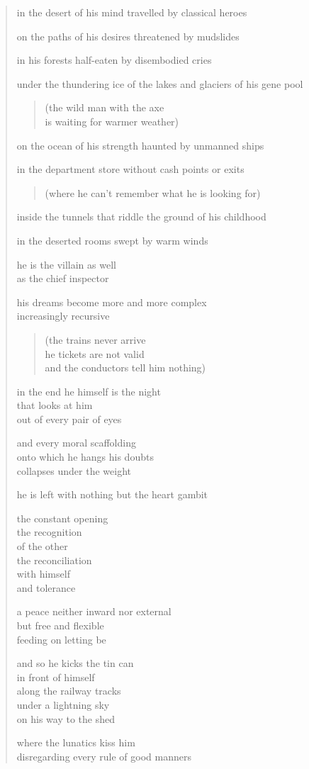 \begin{verse}

in the desert of his mind travelled by classical heroes

on the paths of his desires threatened by mudslides

in his forests half-eaten by disembodied cries

under the thundering ice of the lakes and glaciers of his gene pool

\begin{quote}
(the wild man with the axe\\
is waiting for warmer weather)
\end{quote}

on the ocean of his strength haunted by unmanned ships

in the department store without cash points or exits

\begin{quote}
(where he can't remember what he is looking for)
\end{quote}

inside the tunnels that riddle the ground of his childhood

in the deserted rooms swept by warm winds

he is the villain as well\\
as the chief inspector

his dreams become more and more complex\\
increasingly recursive

\begin{quote}
(the trains never arrive\\
he tickets are not valid\\
and the conductors tell him nothing)
\end{quote}

in the end he himself is the night\\
that looks at him\\
out of every pair of eyes

and every moral scaffolding\\
onto which he hangs his doubts\\
collapses under the weight

he is left with nothing but the heart gambit

the constant opening\\
the recognition\\
of the other\\
the reconciliation\\
with himself\\
and tolerance

a peace neither inward nor external\\
but free and flexible\\
feeding on letting be

and so he kicks the tin can\\
in front of himself\\
along the railway tracks\\
under a lightning sky\\
on his way to the shed

where the lunatics kiss him\\
disregarding every rule of good manners

\end{verse}
